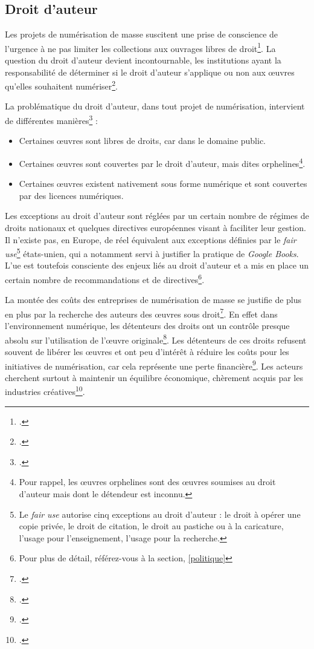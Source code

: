 \subsection{Droit d'auteur}

Les projets de numérisation de masse suscitent une prise de conscience de l'urgence à ne pas limiter les collections aux ouvrages libres de droit\footcite{dufrene_numerisation_2013}. La question du droit d'auteur devient incontournable, les institutions ayant la responsabilité de déterminer si le droit d'auteur s'applique ou non aux \oe{}uvres qu'elles souhaitent numériser\footcite{lopatin_library_2006}. 

La problématique du droit d'auteur, dans tout projet de numérisation, intervient de différentes manières\footcite{dufrene_numerisation_2013} :
\begin{itemize}
\item Certaines \oe{}uvres sont libres de droits, car dans le domaine public.
\item Certaines \oe{}uvres sont couvertes par le droit d'auteur, mais dites orphelines\footnote{Pour rappel, les \oe{}uvres orphelines sont des \oe{}uvres soumises au droit d'auteur mais dont le détendeur est inconnu.}.
\item Certaines \oe{}uvres existent nativement sous forme numérique et sont couvertes par des licences numériques.
\end{itemize}

Les exceptions au droit d'auteur sont réglées par un certain nombre de régimes de droits nationaux et quelques directives européennes visant à faciliter leur gestion. Il n'existe pas, en Europe, de réel équivalent aux exceptions définies par le \textit{fair use}\footnote{Le \textit{fair use} autorise cinq exceptions au droit d'auteur : le droit à opérer une copie privée, le droit de citation, le droit au pastiche ou à la caricature, l'usage pour l'enseignement, l'usage pour la recherche.} états-unien, qui a notamment servi à justifier la pratique de \textit{Google Books}. L'\gls{ue} est toutefois consciente des enjeux liés au droit d'auteur et a mis en place un certain nombre de recommandations et de directives\footnote{Pour plus de détail, référez-vous à la section, \ref{politique}}.

La montée des coûts des entreprises de numérisation de masse se justifie de plus en plus par la recherche des auteurs des \oe{}uvres sous droit\footcite{stobo_i_2018}. En effet dans l'environnement numérique, les détenteurs des droits ont un contrôle presque absolu sur l'utilisation de l'\oe{}uvre originale\footcite{pavlovic_serpent_2011}. Les détenteurs de ces droits refusent souvent de libérer les \oe{}uvres et ont peu d'intérêt à réduire les coûts pour les initiatives de numérisation, car cela représente une perte financière\footcite{stobo_i_2018}. Les acteurs cherchent surtout à maintenir un équilibre économique, chèrement acquis par les industries créatives\footcite{stobo_i_2018}. 

